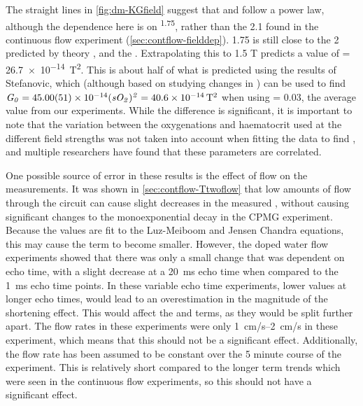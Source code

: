 The straight lines in \autoref{fig:dm-KGfield} suggest that \Kzero and \Gzero follow a power law, although the dependence here is on \Bzero\textsuperscript{1.75}, rather than the \num{2.1} found in the continuous flow experiment (\autoref{sec:contflow-fielddep}).
1.75 is still close to the 2 predicted by theory \cite[Eq. 52-54]{JensenNMRrelaxationtissues2000}, and the .
Extrapolating this to 1.5 T predicts a value of \Gzero = \SI{26.7e-14}{T^2}.
This is about half of what is predicted using the results of Stefanovic, which (although based on studying changes in \SOtwo) can be used to find $\mathit{G_0} = \num{45\pm0.51e-14}  \mathit{(sO_2)^2} = \SI{40.6e-14}{T^2}$ when using \SOtwo = 0.03, the average value from our experiments.
While the difference is significant, it is important to note that the variation between the oxygenations and haematocrit used at the different field strengths was not taken into account when fitting the data to find \Gzero, and multiple researchers \cite{StefanovicHumanwholebloodrelaxometry2004,ChenHumanwholeblood2009,GardenerDependencebloodR22010} have found that these parameters are correlated.



One possible source of error in these results is the effect of flow on the \Ttwo measurements.
It was shown in \autoref{sec:contflow-Ttwoflow} that low amounts of flow through the circuit can cause slight decreases in the measured \Ttwo, without causing significant changes to the monoexponential decay in the CPMG experiment.
Because the \Ttwo values are fit to the Luz-Meiboom and Jensen Chandra equations, this may cause the \TtwoO term to become smaller.
However, the doped water flow experiments showed that there was only a small change that was dependent on echo time, with a slight decrease at a \SI{20}{ms} echo time when compared to the \SI{1}{ms} echo time points.
In these variable echo time experiments, lower \Ttwo values at longer echo times, would lead to an overestimation in the magnitude of the \Ttwo shortening effect.
This would affect the \Kzero and \Gzero terms, as they would be split further apart.
The flow rates in these experiments were only \SIrange{1}{2}{cm/s} in these experiment, which means that this should not be a significant effect.
Additionally, the flow rate has been assumed to be constant over the 5 minute course of the experiment.
This is relatively short compared to the longer term trends which were seen in the continuous flow experiments, so this should not have a significant effect.

